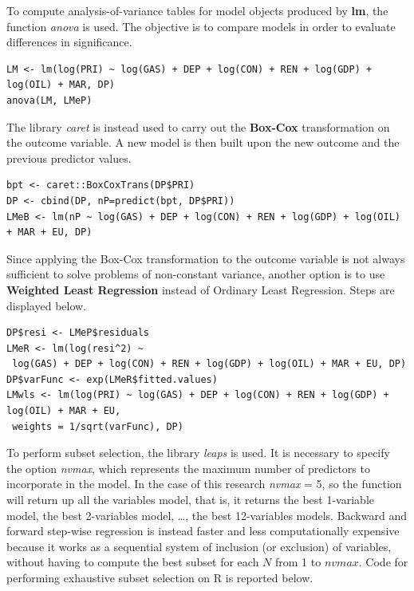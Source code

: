 \documentclass{book}
\begin{document}
\begin{appendices}
To compute analysis-of-variance tables for model objects produced by \textbf{lm}, the function \textit{anova} is used. The objective is to compare models in order to evaluate differences in significance.

\begin{verbatim}
LM <- lm(log(PRI) ~ log(GAS) + DEP + log(CON) + REN + log(GDP) + log(OIL) + MAR, DP)
anova(LM, LMeP)
\end{verbatim}

The library \textit{caret} is instead used to carry out the \textbf{Box-Cox} transformation on the outcome variable. A new model is then built upon the new outcome and the previous predictor values.

\begin{verbatim}
bpt <- caret::BoxCoxTrans(DP$PRI)
DP <- cbind(DP, nP=predict(bpt, DP$PRI))
LMeB <- lm(nP ~ log(GAS) + DEP + log(CON) + REN + log(GDP) + log(OIL) + MAR + EU, DP)
\end{verbatim}
\end{appendices}

Since applying the Box-Cox transformation to the outcome variable is not always sufficient to solve problems of non-constant variance, another option is to use \textbf{Weighted Least Regression} instead of Ordinary Least Regression. Steps are displayed below.

\begin{verbatim}
DP$resi <- LMeP$residuals
LMeR <- lm(log(resi^2) ~
 log(GAS) + DEP + log(CON) + REN + log(GDP) + log(OIL) + MAR + EU, DP)
DP$varFunc <- exp(LMeR$fitted.values)
LMwls <- lm(log(PRI) ~ log(GAS) + DEP + log(CON) + REN + log(GDP) + log(OIL) + MAR + EU,
 weights = 1/sqrt(varFunc), DP)
\end{verbatim}

To perform subset selection, the library \textit{leaps} is used. It is necessary to specify the option \textit{nvmax}, which represents the maximum number of predictors to incorporate in the model. In the case of this research \textit{nvmax} = 5, so the function will return up all the variables model, that is, it returns the best 1-variable model, the best 2-variables model, …, the best 12-variables models. Backward and forward step-wise regression is instead faster and less computationally expensive because it works as a sequential system of inclusion (or exclusion) of variables, without having to compute the best subset for each $N$ from 1 to $nvmax$. Code for performing exhaustive subset selection on R is reported below.
\end{document}
